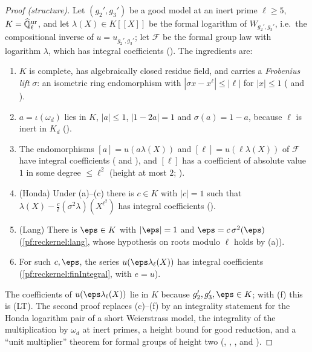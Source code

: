 \begin{proof}[Proof (structure)]
Let $(g_2',g_3')$ be a good model at an inert prime $\ell\ge5$, $K=\widehat{\mathbb{Q}}{}_\ell^{\mathrm{ur}}$, and let $\lambda(X)\in K[[X]]$ be the
formal logarithm of $W_{g_2',g_3'}$, i.e.\ the compositional inverse of $u=u_{g_2',g_3'}$; let $\mathcal F$ be the
formal group law with logarithm $\lambda$, which has integral coefficients
(). The ingredients are:
\begin{enumerate}[label=(\alph*)]
\item $K$ is complete, has algebraically closed residue field, and carries a \emph{Frobenius lift} $\sigma$: an
  isometric ring endomorphism with $|\sigma x-x^\ell|\le|\ell|$ for $|x|\le1$
  ( and ).
\item $a=\iota(\omega_d)$ lies in $K$, $|a|\le1$, $|1-2a|=1$ and $\sigma(a)=1-a$, because $\ell$ is inert in $K_d$
  ().
\item The endomorphisms $[a]=u(a\lambda(X))$ and $[\ell]=u(\ell\lambda(X))$ of $\mathcal F$ have integral
  coefficients ( and ),
  and $[\ell]$ has a coefficient of absolute value $1$ in some degree $\le\ell^2$ (height at most $2$;
  ).
\item (Honda) Under (a)--(c) there is $c\in K$ with $|c|=1$ such that
  $\lambda(X)-\frac c\ell(\sigma^2\lambda)(X^{\ell^2})$ has integral coefficients
  ().
\item (Lang) There is $\eps\in K$ with $|\eps|=1$ and $\eps=c\,\sigma^2(\eps)$ (\cref{pf:reckernel:lang}, whose
  hypothesis on roots modulo $\ell$ holds by (a)).
\item For such $c,\eps$, the series $u(\eps\lambda_\ell(X))$ has integral coefficients
  (\cref{pf:reckernel:finIntegral}, with $e=u$).
\end{enumerate}
The coefficients of $u(\eps\lambda_\ell(X))$ lie in $K$ because $g_2',g_3',\eps\in K$; with (f) this is
(LT). The second proof replaces (c)--(f) by an integrality statement for the Honda logarithm pair of a
short Weierstrass model, the integrality of the multiplication by $\omega_d$ at inert primes, a height bound for good
reduction, and a ``unit multiplier'' theorem for formal groups of height two
(, , , and ).
\end{proof}


